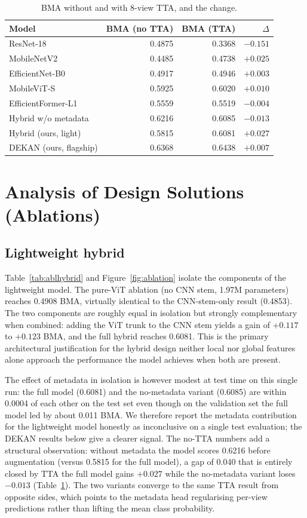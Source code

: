 \begin{table}[H]
\centering
\caption{BMA without and with 8-view TTA, and the change.}
\label{tab:tta}
\begin{tabular}{lrrr}
\toprule
Model & BMA (no TTA) & BMA (TTA) & $\Delta$ \\
\midrule
ResNet-18            & 0.4875 & 0.3368 & $-0.151$ \\
MobileNetV2          & 0.4485 & 0.4738 & $+0.025$ \\
EfficientNet-B0      & 0.4917 & 0.4946 & $+0.003$ \\
MobileViT-S          & 0.5925 & 0.6020 & $+0.010$ \\
EfficientFormer-L1   & 0.5559 & 0.5519 & $-0.004$ \\
\midrule
Hybrid w/o metadata  & 0.6216 & 0.6085 & $-0.013$ \\
Hybrid (ours, light) & 0.5815 & 0.6081 & $+0.027$ \\
DEKAN (ours, flagship) & 0.6368 & 0.6438 & $+0.007$ \\
\bottomrule
\end{tabular}
\end{table}

\section{Analysis of Design Solutions (Ablations)}
\label{subsec:ablation-study}

\subsection{Lightweight hybrid}

Table~\ref{tab:ablhybrid} and Figure~\ref{fig:ablation} isolate the components of
the lightweight model. The pure-ViT ablation (no CNN stem, 1.97M parameters)
reaches 0.4908 BMA, virtually identical to the CNN-stem-only result (0.4853). The
two components are roughly equal in isolation but strongly complementary when
combined: adding the ViT trunk to the CNN stem yields a gain of $+0.117$ to
$+0.123$ BMA, and the full hybrid reaches 0.6081. This is the primary
architectural justification for the hybrid design neither local nor global
features alone approach the performance the model achieves when both are present.

The effect of metadata in isolation is however modest at test time on this
single run: the full model (0.6081) and the no-metadata variant (0.6085) are
within 0.0004 of each other on the test set even though on the validation set
the full model led by about 0.011 BMA. We therefore report the metadata
contribution for the lightweight model honestly as inconclusive on a single test
evaluation; the DEKAN results below give a clearer signal. The no-TTA numbers add
a structural observation: without metadata the model scores 0.6216 before
augmentation (versus 0.5815 for the full model), a gap of 0.040 that is entirely
closed by TTA the full model gains $+0.027$ while the no-metadata variant
loses $-0.013$ (Table~\ref{tab:tta}). The two variants converge to the same TTA
result from opposite sides, which points to the metadata head regularising
per-view predictions rather than lifting the mean class probability.

